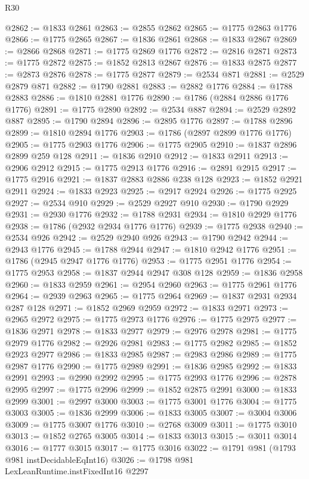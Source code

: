 \begin{lexlean}{R30}
\begin{coremodule}
{{{{{@2862 := @1833 @2861
@2863 := @2855 @2862
@2865 := @1775 @2863 @1776
@2866 := @1775 @2865
@2867 := @1836 @2861
@2868 := @1833 @2867
@2869 := @2866 @2868
@2871 := @1775 @2869 @1776
@2872 := @2816 @2871
@2873 := @1775 @2872
@2875 := @1852 @2813 @2867
@2876 := @1833 @2875
@2877 := @2873 @2876
@2878 := @1775 @2877
@2879 := @2534 @871
@2881 := @2529 @2879 @871
@2882 := @1790 @2881
@2883 := @2882 @1776
@2884 := @1788 @2883
@2886 := @1810 @2881 @1776
@2890 := @1786 (@2884 @2886 @1776 @1776)
@2891 := @1775 @2890
@2892 := @2534 @887
@2894 := @2529 @2892 @887
@2895 := @1790 @2894
@2896 := @2895 @1776
@2897 := @1788 @2896
@2899 := @1810 @2894 @1776
@2903 := @1786 (@2897 @2899 @1776 @1776)
@2905 := @1775 @2903 @1776
@2906 := @1775 @2905
@2910 := @1837 @2896 @2899 @259 @128
@2911 := @1836 @2910
@2912 := @1833 @2911
@2913 := @2906 @2912
@2915 := @1775 @2913 @1776
@2916 := @2891 @2915
@2917 := @1775 @2916
@2921 := @1837 @2883 @2886 @238 @128
@2923 := @1852 @2921 @2911
@2924 := @1833 @2923
@2925 := @2917 @2924
@2926 := @1775 @2925
@2927 := @2534 @910
@2929 := @2529 @2927 @910
@2930 := @1790 @2929
@2931 := @2930 @1776
@2932 := @1788 @2931
@2934 := @1810 @2929 @1776
@2938 := @1786 (@2932 @2934 @1776 @1776)
@2939 := @1775 @2938
@2940 := @2534 @926
@2942 := @2529 @2940 @926
@2943 := @1790 @2942
@2944 := @2943 @1776
@2945 := @1788 @2944
@2947 := @1810 @2942 @1776
@2951 := @1786 (@2945 @2947 @1776 @1776)
@2953 := @1775 @2951 @1776
@2954 := @1775 @2953
@2958 := @1837 @2944 @2947 @308 @128
@2959 := @1836 @2958
@2960 := @1833 @2959
@2961 := @2954 @2960
@2963 := @1775 @2961 @1776
@2964 := @2939 @2963
@2965 := @1775 @2964
@2969 := @1837 @2931 @2934 @287 @128
@2971 := @1852 @2969 @2959
@2972 := @1833 @2971
@2973 := @2965 @2972
@2975 := @1775 @2973 @1776
@2976 := @1775 @2975
@2977 := @1836 @2971
@2978 := @1833 @2977
@2979 := @2976 @2978
@2981 := @1775 @2979 @1776
@2982 := @2926 @2981
@2983 := @1775 @2982
@2985 := @1852 @2923 @2977
@2986 := @1833 @2985
@2987 := @2983 @2986
@2989 := @1775 @2987 @1776
@2990 := @1775 @2989
@2991 := @1836 @2985
@2992 := @1833 @2991
@2993 := @2990 @2992
@2995 := @1775 @2993 @1776
@2996 := @2878 @2995
@2997 := @1775 @2996
@2999 := @1852 @2875 @2991
@3000 := @1833 @2999
@3001 := @2997 @3000
@3003 := @1775 @3001 @1776
@3004 := @1775 @3003
@3005 := @1836 @2999
@3006 := @1833 @3005
@3007 := @3004 @3006
@3009 := @1775 @3007 @1776
@3010 := @2768 @3009
@3011 := @1775 @3010
@3013 := @1852 @2765 @3005
@3014 := @1833 @3013
@3015 := @3011 @3014
@3016 := @1777 @3015
@3017 := @1775 @3016
@3022 := @1791 @981 (@1793 @981 instDecidableEqInt16)
@3026 := @1798 @981 LexLeanRuntime.instFixedInt16 @2297
}}}}}
\end{coremodule}
\end{lexlean}
